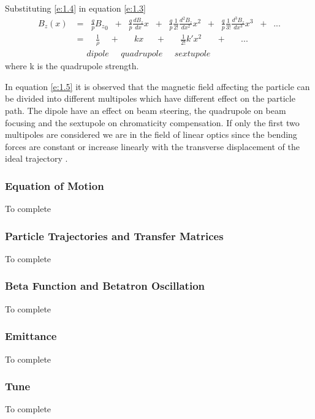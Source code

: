 Substituting \ref{e:1.4} in equation \ref{e:1.3}
\begin{align} \label{e:1.5} %
  B_z(x) &= \;\;\frac{q}{p}{B_z}_0\;\;+\;\;\frac{q}{p}\frac{dB_z}{dx}x\;\;+\;\;\frac{q}{p}\frac{1}{2!}\frac{d^2B_z}{dx^2}x^2\;\;+\;\;\frac{q}{p}\frac{1}{3!}\frac{d^3B_z}{dx^3}x^3\;\;+\;\;... \nonumber\\
         &= \;\;\;\;\frac{1}{\rho}\;\;\;\;+\;\;\;\;\;\; kx \;\;\;\;\;+\;\;\;\;\;\;\frac{1}{2!}k'x^2\;\;\;\;\;\;+\;\;\;\;\;\;...\\
         &  \;\;\;\;\;dipole\;\;\;\;\;quadrupole\;\;\;\;\;sextupole \nonumber
\end{align}
where k is the quadrupole strength.

In equation \ref{e:1.5} it is observed that the magnetic field affecting the particle can be divided into different multipoles which have different effect on the particle path. The dipole have an effect on beam steering, the quadrupole on beam focusing and the sextupole on chromaticity compensation. If only the first two multipoles are considered we are in the field of linear optics since the bending forces are constant or increase linearly with the transverse displacement of the ideal trajectory \cite{wille2000physics}.

\subsubsection{Equation of Motion} %

To complete 


\subsubsection{Particle Trajectories and Transfer Matrices} %

To complete


\subsubsection{Beta Function and Betatron Oscillation} %

To complete

\subsubsection{Emittance} %

To complete

\subsubsection{Tune} %

To complete




  